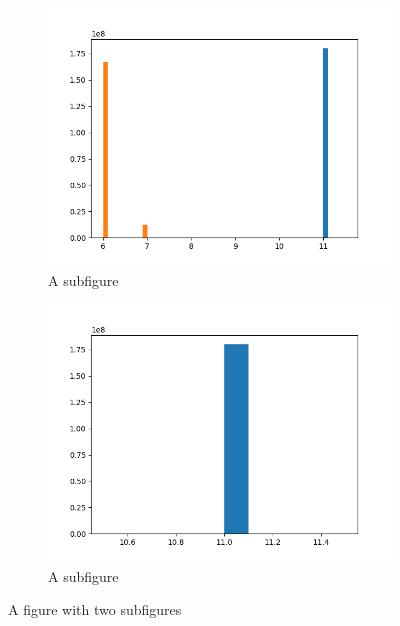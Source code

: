 \begin{figure}[H]
	\centering
	\begin{subfigure}{.5\textwidth}
		\centering
\includegraphics[scale=0.45]{img/click_time_day_distribution.png}
		\caption{A subfigure}
		\label{fig:sub1}
	\end{subfigure}%
	\begin{subfigure}{.5\textwidth}
		\centering
\includegraphics[scale=0.45]{img/click_time_month_distribution.png}
		\caption{A subfigure}
		\label{fig:sub2}
	\end{subfigure}
	\caption{A figure with two subfigures}
	\label{fig:test}
\end{figure}
